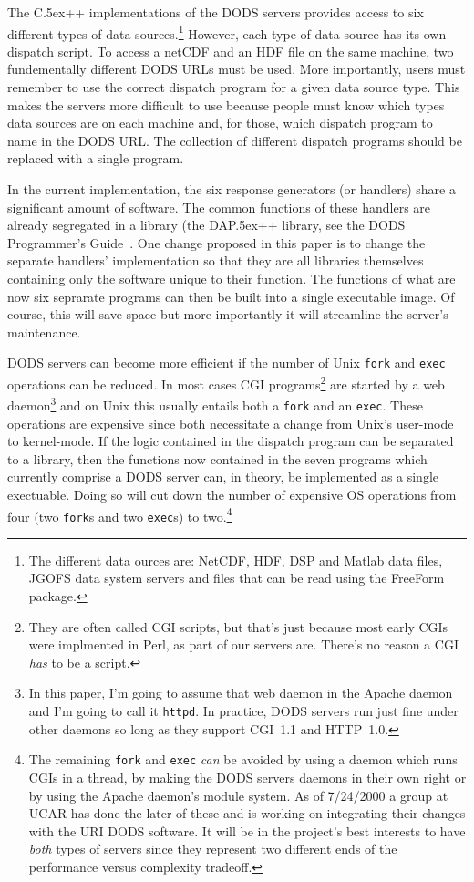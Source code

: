 \documentclass{article}
\newcommand{\httpd}{\texttt{httpd}\xspace}
\newcommand{\Cpp}{\rm {\small C}\raise.5ex\hbox{\footnotesize ++}\xspace}
\newcommand{\dap}{\rm {\small DAP}\raise.5ex\hbox{\footnotesize ++}\xspace}
\begin{document}
The \Cpp implementations of the DODS servers provides access to six different
types of data sources.\footnote{The different data ources are: NetCDF, HDF,
  DSP and Matlab data files, JGOFS data system servers and files that can be
  read using the FreeForm package.} However, each type of data source has its
own dispatch script. To access a netCDF and an HDF file on the same machine,
two fundementally different DODS URLs  must be used. More
importantly, users must remember to use the correct dispatch program for a
given data source type. This makes the servers more difficult to use because
people must know which types data sources are on each machine and, for those,
which dispatch program to name in the DODS URL. The collection of different
dispatch programs should be replaced with a single program.

In the current implementation, the six response generators (or handlers)
share a significant amount of software. The common functions of these
handlers are already segregated in a library (the \dap library, see the DODS
Programmer's Guide~\cite{DODS:prog-guide}. One change proposed in this
paper is to change the separate handlers' implementation so that they are all
libraries themselves containing only the software unique to their function.
The functions of what are now six seprarate programs can then be built into a
single executable image. Of course, this will save space but more importantly
it will streamline the server's maintenance.

DODS servers can become more efficient if the number of Unix \texttt{fork}
and \texttt{exec} operations can be reduced. In most cases CGI
programs\footnote{They are often called CGI scripts, but that's just because
  most early CGIs were implmented in Perl, as part of our servers are.
  There's no reason a CGI \emph{has} to be a script.} are started by a web
daemon\footnote{In this paper, I'm going to assume that web daemon in the
  Apache daemon and I'm going to call it \httpd. In practice, DODS
  servers run just fine under other daemons so long as they support CGI~1.1
  and HTTP~1.0.} and on Unix this usually entails both a \texttt{fork} and an
\texttt{exec}. These operations are expensive since both necessitate a change
from Unix's user-mode to kernel-mode. If the logic contained in the dispatch
program can be separated to a library, then the functions now contained in
the seven programs which currently comprise a DODS server can, in theory, be
implemented as a single exectuable. Doing so will cut down the number of
expensive OS operations from four (two \texttt{fork}s and two \texttt{exec}s)
to two.\footnote{The remaining \texttt{fork} and \texttt{exec} \emph{can} be
    avoided by using a daemon which runs CGIs in a thread, by making the
    DODS servers daemons in their own right or by using the Apache daemon's
    module system. As of 7/24/2000 a group at UCAR has done the later of
    these and is working on integrating their changes with the URI DODS
    software. It will be in the project's best interests to have \emph{both}
    types of servers since they represent two different ends of the
    performance versus complexity tradeoff.}
  
\end{document}

